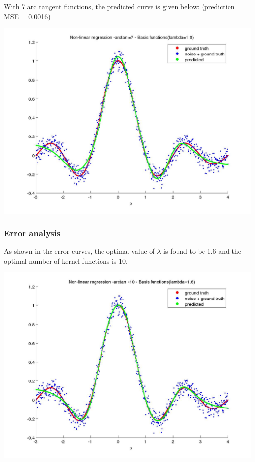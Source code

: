 \documentclass[fleqn]{article}
\begin{document}
With 7 arc tangent functions, the predicted curve is given below: (prediction MSE = 0.0016)

\includegraphics[scale=0.3]{./pics/task4/arctan =7 - Basis functions(lambda=1.6)_train.jpg}

\subsubsection{Error analysis}
As shown in the error curves, the optimal value of $\lambda$ is found to be 1.6 and the optimal number of kernel functions is 10.

\includegraphics[scale=0.3]{./pics/task4/arctan =10 - Basis functions(lambda=1.6)_train.jpg}
\end{document}
